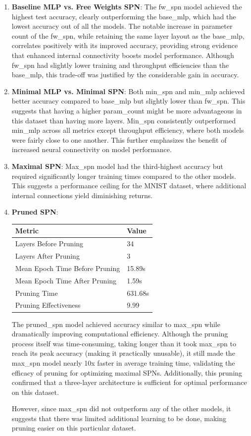 \begin{enumerate}
\item \textbf{Baseline MLP vs. Free Weights SPN}: The fw\_spn model achieved the highest test accuracy, clearly outperforming the base\_mlp, which had the lowest accuracy out of all the models. The notable increase in parameter count of the fw\_spn, while retaining the same layer layout as the base\_mlp, correlates positively with its improved accuracy, providing strong evidence that enhanced internal connectivity boosts model performance. Although fw\_spn had slightly lower training and throughput efficiencies than the base\_mlp, this trade-off was justified by the considerable gain in accuracy.
\item \textbf{Minimal MLP vs. Minimal SPN}: Both min\_spn and min\_mlp achieved better accuracy compared to base\_mlp but slightly lower than fw\_spn. This suggests that having a higher param\_count might be more advantageous in this dataset than having more layers. Min\_spn consistently outperformed min\_mlp across all metrics except throughput efficiency, where both models were fairly close to one another. This further emphasizes the benefit of increased neural connectivity on model performance.
\item \textbf{Maximal SPN}: Max\_spn model had the third-highest accuracy but required significantly longer training times compared to the other models. This suggests a performance ceiling for the MNIST dataset, where additional internal connections yield diminishing returns.
\item \textbf{Pruned SPN}:
\begin{center}  %
\begin{tabular}{|l|l|}
\hline
\textbf{Metric} & \textbf{Value} \\
\hline
Layers Before Pruning & 34 \\
Layers After Pruning & 3 \\
Mean Epoch Time Before Pruning & 15.89s \\
Mean Epoch Time After Pruning & 1.59s \\
Pruning Time & 631.68s \\
Pruning Effectiveness & 9.99 \\
\hline
\end{tabular}
\end{center}

The pruned\_spn model achieved accuracy similar to max\_spn while dramatically improving computational efficiency. Although the pruning process itself was time-consuming, taking longer than it took max\_spn to reach its peak accuracy (making it practically unusable), it still made the max\_spn model nearly 10x faster in average training time, validating the efficacy of pruning for optimizing maximal SPNs. Additionally, this pruning confirmed that a three-layer architecture is sufficient for optimal performance on this dataset. 

However, since max\_spn did not outperform any of the other models, it suggests that there was limited additional learning to be done, making pruning easier on this particular dataset.
\end{enumerate}

